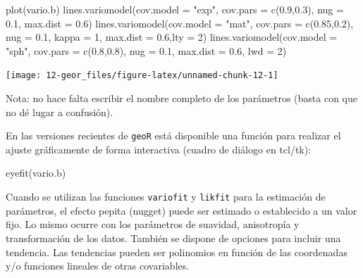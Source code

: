 \documentclass[
  spanish,
]{book}
\newenvironment{Shaded}{\begin{snugshade}}{\end{snugshade}}
\newcommand{\AttributeTok}[1]{\textcolor[rgb]{0.77,0.63,0.00}{#1}}
\newcommand{\DecValTok}[1]{\textcolor[rgb]{0.00,0.00,0.81}{#1}}
\newcommand{\FloatTok}[1]{\textcolor[rgb]{0.00,0.00,0.81}{#1}}
\newcommand{\FunctionTok}[1]{\textcolor[rgb]{0.00,0.00,0.00}{#1}}
\newcommand{\NormalTok}[1]{#1}
\newcommand{\StringTok}[1]{\textcolor[rgb]{0.31,0.60,0.02}{#1}}
\theoremstyle{break}
\theoremstyle{definition}
\theoremstyle{definition}
\theoremstyle{definition}
\theoremstyle{definition}
\theoremstyle{remark}
\begin{document}
\begin{Shaded}
\begin{Highlighting}[]
\FunctionTok{plot}\NormalTok{(vario.b)}
\FunctionTok{lines.variomodel}\NormalTok{(}\AttributeTok{cov.model =} \StringTok{"exp"}\NormalTok{, }\AttributeTok{cov.pars =} \FunctionTok{c}\NormalTok{(}\FloatTok{0.9}\NormalTok{,}\FloatTok{0.3}\NormalTok{), }\AttributeTok{nug =} \FloatTok{0.1}\NormalTok{, }\AttributeTok{max.dist =} \FloatTok{0.6}\NormalTok{)}
\FunctionTok{lines.variomodel}\NormalTok{(}\AttributeTok{cov.model =} \StringTok{"mat"}\NormalTok{, }\AttributeTok{cov.pars =} \FunctionTok{c}\NormalTok{(}\FloatTok{0.85}\NormalTok{,}\FloatTok{0.2}\NormalTok{), }\AttributeTok{nug =} \FloatTok{0.1}\NormalTok{, }\AttributeTok{kappa =} \DecValTok{1}\NormalTok{, }\AttributeTok{max.dist =} \FloatTok{0.6}\NormalTok{,}\AttributeTok{lty =} \DecValTok{2}\NormalTok{)}
\FunctionTok{lines.variomodel}\NormalTok{(}\AttributeTok{cov.model =} \StringTok{"sph"}\NormalTok{, }\AttributeTok{cov.pars =} \FunctionTok{c}\NormalTok{(}\FloatTok{0.8}\NormalTok{,}\FloatTok{0.8}\NormalTok{), }\AttributeTok{nug =} \FloatTok{0.1}\NormalTok{, }\AttributeTok{max.dist =} \FloatTok{0.6}\NormalTok{, }\AttributeTok{lwd =} \DecValTok{2}\NormalTok{)}
\end{Highlighting}
\end{Shaded}

\begin{center}\texttt{[image: 12-geor\_files/figure-latex/unnamed-chunk-12-1]} \end{center}

Nota: no hace falta escribir el nombre completo de los parámetros
(basta con que no dé lugar a confusión).

En las versiones recientes de \texttt{geoR} está disponible una función para
realizar el ajuste gráficamente de forma interactiva
(cuadro de diálogo en tcl/tk):

\begin{Shaded}
\begin{Highlighting}[]
\FunctionTok{eyefit}\NormalTok{(vario.b)}
\end{Highlighting}
\end{Shaded}

Cuando se utilizan las funciones \texttt{variofit} y \texttt{likfit} para la
estimación de parámetros, el efecto pepita (nugget) puede ser estimado o
establecido a un valor fijo. Lo mismo ocurre con los parámetros de
suavidad, anisotropía y transformación de los datos. También se dispone
de opciones para incluir una tendencia. Las tendencias pueden ser
polinomios en función de las coordenadas y/o funciones lineales de otras
covariables.
\end{document}
